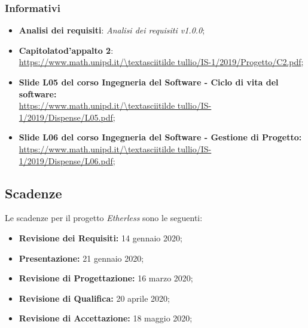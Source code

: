 \subsubsection{Informativi}
\begin{itemize}
	\item \textbf{Analisi dei requisiti}: \textit{Analisi dei requisiti v1.0.0};
    \item \textbf{Capitolato\glo d'appalto 2}:\\ 
			\url{https://www.math.unipd.it/\textasciitilde tullio/IS-1/2019/Progetto/C2.pdf};
	\item \textbf{Slide L05 del corso Ingegneria del Software - Ciclo di vita del software:} \\
			\url{https://www.math.unipd.it/\textasciitilde tullio/IS-1/2019/Dispense/L05.pdf};
	\item \textbf{Slide L06 del corso Ingegneria del Software - Gestione di Progetto:} \\
			\url{https://www.math.unipd.it/\textasciitilde tullio/IS-1/2019/Dispense/L06.pdf};
\end{itemize}
\subsection{Scadenze}
Le scadenze per il progetto \textit{Etherless} sono le seguenti:
\begin{itemize}
	\item \textbf{Revisione dei Requisiti:} 14 gennaio 2020;
	\item \textbf{Presentazione:} 21 gennaio 2020;
	\item \textbf{Revisione di Progettazione:} 16 marzo 2020;
	\item \textbf{Revisione di Qualifica:} 20 aprile 2020;
	\item \textbf{Revisione di Accettazione:} 18 maggio 2020;
\end{itemize}

	
	
	